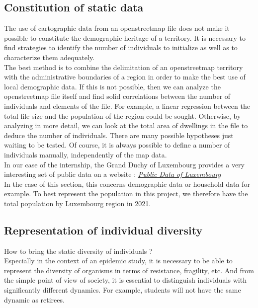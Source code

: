 \subsection{Constitution of static data}

The use of cartographic data from an openstreetmap file does not make it possible to constitute the demographic heritage of a territory. It is necessary to find strategies to identify the number of individuals to initialize as well as to characterize them adequately.\\

The best method is to combine the delimitation of an openstreetmap territory with the administrative boundaries of a region in order to make the best use of local demographic data. If this is not possible, then we can analyze the openstreetmap file itself and find solid correlations between the number of individuals and elements of the file. For example, a linear regression between the total file size and the population of the region could be sought. Otherwise, by analyzing in more detail, we can look at the total area of dwellings in the file to deduce the number of individuals. There are many possible hypotheses just waiting to be tested. Of course, it is always possible to define a number of individuals manually, independently of the map data.\\

In our case of the internship, the Grand Duchy of Luxembourg provides a very interesting set of public data on a website : 
\href{https://data.public.lu/fr/ }{\textit{Public Data of Luxembourg}}\\


In the case of this section, this concerns demographic data or household data for example. To best represent the population in this project, we therefore have the total population by Luxembourg region in 2021.\\

\subsection{Representation of individual diversity}

How to bring the static diversity of individuals ?\\

Especially in the context of an epidemic study, it is necessary to be able to represent the diversity of organisms in terms of resistance, fragility, etc. And from the simple point of view of society, it is essential to distinguish individuals with significantly different dynamics. For example, students will not have the same dynamic as retirees.\\

